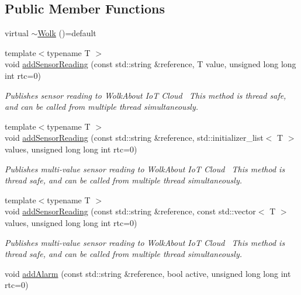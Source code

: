 \subsection*{Public Member Functions}
\begin{DoxyCompactItemize}
\item 
virtual \hyperlink{classwolkabout_1_1_wolk_a213707a5be879c29a5a32e7ae264e18e}{$\sim$\+Wolk} ()=default
\item 
{\footnotesize template$<$typename T $>$ }\\void \hyperlink{classwolkabout_1_1_wolk_a8b0e5e82c95c206361bc555091581721}{add\+Sensor\+Reading} (const std\+::string \&reference, T value, unsigned long long int rtc=0)
\begin{DoxyCompactList}\small\item\em Publishes sensor reading to Wolk\+About IoT Cloud~\newline
 This method is thread safe, and can be called from multiple thread simultaneously. \end{DoxyCompactList}\item 
{\footnotesize template$<$typename T $>$ }\\void \hyperlink{classwolkabout_1_1_wolk_a107e97d09b14a9ec270834b084aa57c0}{add\+Sensor\+Reading} (const std\+::string \&reference, std\+::initializer\+\_\+list$<$ T $>$ values, unsigned long long int rtc=0)
\begin{DoxyCompactList}\small\item\em Publishes multi-\/value sensor reading to Wolk\+About IoT Cloud~\newline
 This method is thread safe, and can be called from multiple thread simultaneously. \end{DoxyCompactList}\item 
{\footnotesize template$<$typename T $>$ }\\void \hyperlink{classwolkabout_1_1_wolk_a312f30b081b6d4a8f1bb7e2215de0e5d}{add\+Sensor\+Reading} (const std\+::string \&reference, const std\+::vector$<$ T $>$ values, unsigned long long int rtc=0)
\begin{DoxyCompactList}\small\item\em Publishes multi-\/value sensor reading to Wolk\+About IoT Cloud~\newline
 This method is thread safe, and can be called from multiple thread simultaneously. \end{DoxyCompactList}\item 
void \hyperlink{classwolkabout_1_1_wolk_a8bcc9b4aab0fde2de3483d5d2e09e557}{add\+Alarm} (const std\+::string \&reference, bool active, unsigned long long int rtc=0)

\end{DoxyCompactItemize}

